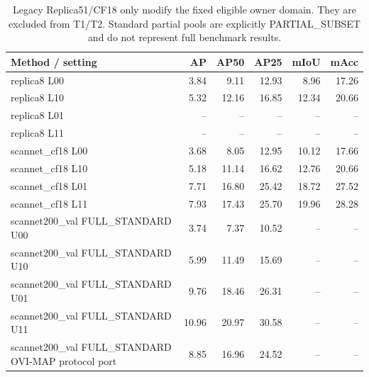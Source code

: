 \begin{table}[t]
\centering
\small
\caption{Legacy Replica51/CF18 only modify the fixed eligible owner domain. They are excluded from T1/T2. Standard partial pools are explicitly PARTIAL\_SUBSET and do not represent full benchmark results.}
\label{tab:benchmark-s2}
\begin{tabular}{lrrrrr}
\toprule
Method / setting & AP & AP50 & AP25 & mIoU & mAcc \\
\midrule
replica8 L00 & 3.84 & 9.11 & 12.93 & 8.96 & 17.26 \\
replica8 L10 & 5.32 & 12.16 & 16.85 & 12.34 & 20.66 \\
replica8 L01 & -- & -- & -- & -- & -- \\
replica8 L11 & -- & -- & -- & -- & -- \\
scannet\_cf18 L00 & 3.68 & 8.05 & 12.95 & 10.12 & 17.66 \\
scannet\_cf18 L10 & 5.18 & 11.14 & 16.62 & 12.76 & 20.66 \\
scannet\_cf18 L01 & 7.71 & 16.80 & 25.42 & 18.72 & 27.52 \\
scannet\_cf18 L11 & 7.93 & 17.43 & 25.70 & 19.96 & 28.28 \\
scannet200\_val FULL\_STANDARD U00 & 3.74 & 7.37 & 10.52 & -- & -- \\
scannet200\_val FULL\_STANDARD U10 & 5.99 & 11.49 & 15.69 & -- & -- \\
scannet200\_val FULL\_STANDARD U01 & 9.76 & 18.46 & 26.31 & -- & -- \\
scannet200\_val FULL\_STANDARD U11 & 10.96 & 20.97 & 30.58 & -- & -- \\
scannet200\_val FULL\_STANDARD OVI-MAP protocol port & 8.85 & 16.96 & 24.52 & -- & -- \\
\bottomrule
\end{tabular}
\end{table}
